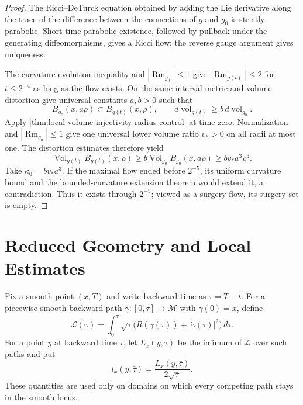 \begin{proof}
The Ricci--DeTurck equation obtained by adding the Lie derivative along the
trace of the difference between the connections of $g$ and $g_0$ is strictly
parabolic.  Short-time parabolic existence, followed by pullback under the
generating diffeomorphisms, gives a Ricci flow; the reverse gauge argument
gives uniqueness.

The curvature evolution inequality and $|\operatorname{Rm}_{g_0}|\le1$ give
$|\operatorname{Rm}_{g(t)}|\le2$ for $t\le2^{-4}$ as long as the flow
exists.  On the same interval metric and volume distortion give universal
constants $a,b>0$ such that
\[
 B_{g_0}(x,a\rho)\subset B_{g(t)}(x,\rho),
 \qquad
 d\operatorname{vol}_{g(t)}\ge b\,d\operatorname{vol}_{g_0}.
\]
Apply \ref{thm:local-volume-injectivity-radius-control} at time zero.
Normalization and $|\operatorname{Rm}_{g_0}|\le1$ give one universal lower
volume ratio $v_*>0$ on all radii at most one.  The distortion estimates therefore
yield
\[
 \operatorname{Vol}_{g(t)}B_{g(t)}(x,\rho)
 \ge b\operatorname{Vol}_{g_0}B_{g_0}(x,a\rho)
 \ge bv_*a^3\rho^3.
\]
Take $\kappa_0=bv_*a^3$.  If the maximal flow ended before
$2^{-5}$, its uniform curvature bound and the bounded-curvature extension
theorem would extend it, a contradiction.  Thus it exists through $2^{-5}$;
viewed as a surgery flow, its surgery set is empty.
\end{proof}

\section{Reduced Geometry and Local Estimates}

\begin{definition}
\label{def:reduced-length}
\notready
Fix a smooth point $(x,T)$ and write backward time as $\tau=T-t$.  For a
piecewise smooth backward path $\gamma\colon[0,\bar\tau]\to\mathcal M$
with $\gamma(0)=x$, define
\[
 \mathcal L(\gamma)=
 \int_0^{\bar\tau}\sqrt\tau
 \bigl(R(\gamma(\tau))+|\dot\gamma(\tau)|^2\bigr)\,d\tau.
\]
For a point $y$ at backward time $\bar\tau$, let
$L_x(y,\bar\tau)$ be the infimum of $\mathcal L$ over such paths and put
\[
 l_x(y,\bar\tau)=\frac{L_x(y,\bar\tau)}{2\sqrt{\bar\tau}}.
\]
These quantities are used only on domains on which every competing path
stays in the smooth locus.
\end{definition}

